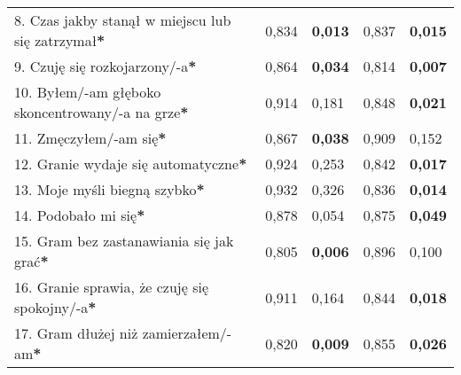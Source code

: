 \begin{table}[!h]
\begin{center}
\begin{tabular}{|m{10em}|m{5em}|m{5em}|m{5em}|m{5em}|}
            8. Czas jakby stanął w miejscu lub się zatrzymał\textbf{*}                  & 0,834                             & \textbf{0,013}         & 0,837                         & \textbf{0,015}     \\
            9. Czuję się \newline rozkojarzony/-a\textbf{*}                             & 0,864                             & \textbf{0,034}         & 0,814                         & \textbf{0,007}     \\
            10. Byłem/-am głęboko \newline skoncentrowany/-a \newline na grze\textbf{*} & 0,914                             & 0,181                  & 0,848                         & \textbf{0,021}     \\
            11. Zmęczyłem/-am się\textbf{*}                                             & 0,867                             & \textbf{0,038}         & 0,909                         & 0,152              \\
            12. Granie wydaje się automatyczne\textbf{*}                                & 0,924                             & 0,253                  & 0,842                         & \textbf{0,017}     \\
            13. Moje myśli \newline biegną szybko\textbf{*}                             & 0,932                             & 0,326                  & 0,836                         & \textbf{0,014}     \\
            14. Podobało mi się\textbf{*}                                               & 0,878                             & 0,054                  & 0,875                         & \textbf{0,049}     \\
            15. Gram bez zastanawiania się jak grać\textbf{*}                           & 0,805                             & \textbf{0,006}         & 0,896                         & 0,100              \\
            16. Granie sprawia, \newline że czuję się spokojny/-a\textbf{*}             & 0,911                             & 0,164                  & 0,844                         & \textbf{0,018}     \\
            17. Gram dłużej \newline niż zamierzałem/-am\textbf{*}                      & 0,820                             & \textbf{0,009}         & 0,855                         & \textbf{0,026}     \\

\end{tabular}
\end{center}
\end{table}
